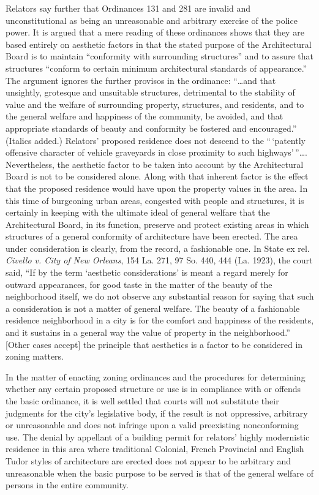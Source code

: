 Relators say further that Ordinances 131 and 281 are invalid and
unconstitutional as being an unreasonable and arbitrary exercise of the police
power. It is argued that a mere reading of these ordinances shows that they are
based entirely on aesthetic factors in that the stated purpose of the
Architectural Board is to maintain ``conformity with surrounding structures''
and to assure that structures ``conform to certain minimum architectural
standards of appearance.'' The argument ignores the further provisos in the
ordinance: ``\ldots and that unsightly, grotesque and unsuitable structures,
detrimental to the stability of value and the welfare of surrounding property,
structures, and residents, and to the general welfare and happiness of the
community, be avoided, and that appropriate standards of beauty and conformity
be fostered and encouraged.'' (Italics added.) Relators' proposed residence does
not descend to the ``\,`patently offensive character of vehicle graveyards in
close proximity to such highways'\,''\ldots. Nevertheless, the aesthetic factor
to be taken into account by the Architectural Board is not to be considered
alone. Along with that inherent factor is the effect that the proposed residence
would have upon the property values in the area. In this time of burgeoning
urban areas, congested with people and structures, it is certainly in keeping
with the ultimate ideal of general welfare that the Architectural Board, in its
function, preserve and protect existing areas in which structures of a general
conformity of architecture have been erected. The area under consideration is
clearly, from the record, a fashionable one. In State ex rel. \emph{Civello v.
City of New Orleans}, 154 La. 271, 97 So. 440, 444 (La. 1923), the court said,
``If by the term `aesthetic considerations' is meant a regard merely for outward
appearances, for good taste in the matter of the beauty of the neighborhood
itself, we do not observe any substantial reason for saying that such a
consideration is not a matter of general welfare. The beauty of a fashionable
residence neighborhood in a city is for the comfort and happiness of the
residents, and it sustains in a general way the value of property in the
neighborhood.'' [Other cases accept] the principle that aesthetics is a factor
to be considered in zoning matters.

In the matter of enacting zoning ordinances and the procedures for determining
whether any certain proposed structure or use is in compliance with or offends
the basic ordinance, it is well settled that courts will not substitute their
judgments for the city's legislative body, if the result is not oppressive,
arbitrary or unreasonable and does not infringe upon a valid preexisting
nonconforming use. The denial by appellant of a building permit for relators'
highly modernistic residence in this area where traditional Colonial, French
Provincial and English Tudor styles of architecture are erected does not appear
to be arbitrary and unreasonable when the basic purpose to be served is that of
the general welfare of persons in the entire community.

